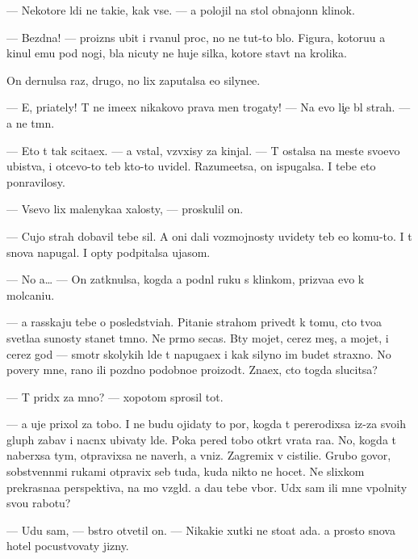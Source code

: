\documentclass[10pt]{book}
\begin{document}
— Nekotor{\yi}{\y}e l{\io}di ne taki{\y}e, kak vse. — {\Y}a polojil na stol obnajonn{\yi}{\y} klinok.

— Bezdna! — proizn{\e}s ubit{\yi}{\y} i rvanul proc, no ne tut-to b{\yi}lo. Figura, kotoru{\y}u {\y}a kinul {\y}emu pod nogi, b{\yi}la nicuty ne huje silka, ko\-to\-r{\yi}\-{\y}e stav{\ia}t na krolika.

On dernulsa raz, drugo{\y}, no lix zaputalsa {\y}e{\x}o silyne{\y}e.

— E{\y}, pri{\y}ately! T{\yi} ne ime{\y}ex nikakovo prava men{\ia} trogaty! — Na {\y}evo li{\c}e b{\yi}l strah. — {\Y}a ne t{\e}mn{\yi}{\y}.

— Eto t{\yi} tak scita{\y}ex. — {\Y}a vstal, vz{\ia}vxisy za kinjal. — T{\yi} ostalsa na meste svo{\y}evo ubi{\y}stva, i otcevo-to teb{\ia} kto-to uvidel. Razume{\y}etsa, on ispugalsa. I tebe eto ponravilosy.

— Vsevo lix malenyka{\y}a xalosty, — proskulil on.

— Cujo{\y} strah dobavil tebe sil. A oni dali vozmojnosty uvidety teb{\ia} {\y}e{\x}o komu-to. I t{\yi} snova napugal. I op{\ia}ty podpitalsa ujasom.

— No {\y}a… — On zatknulsa, kogda {\y}a podn{\ia}l ruku s klinkom, priz{\yi}va{\y}a {\y}evo k molcani{\y}u.

— {\Y}a rasskaju tebe o posledstvi{\y}ah. Pitani{\y}e strahom prived{\e}t k tomu, cto tvo{\y}a svetla{\y}a su{\x}nosty stanet t{\e}mno{\y}. Ne pr{\ia}mo se{\y}cas. B{\yi}ty mojet, cerez mes{\ia}{\c}, a mojet, i cerez god — smotr{\ia} skolykih l{\io}de{\y} t{\yi} napuga{\y}ex i kak silyno im budet straxno. No povery mne, rano ili pozdno po\-dob\-no\-{\y}e proizo{\y}d{\e}t. Zna{\y}ex, cto togda slucitsa?

— T{\yi} prid{\e}x za mno{\y}? — xopotom sprosil tot.

— {\Y}a uje prixol za tobo{\y}. I ne budu ojidaty to{\y} por{\yi}, kogda t{\yi} pererodixsa iz-za svo{\y}ih glup{\yi}h zabav i nacn{\e}x ubivaty l{\io}de{\y}. Poka pered tobo{\y} otkr{\yi}t{\yi} vra\-ta ra{\y}a. No, kogda t{\yi} naber{\e}xsa tym{\yi}, otpravixsa ne naverh, a vniz. Zagremix v cistili{\x}e. Grubo go\-vo\-r{\ia}, sobstvenn{\yi}mi rukami otpravix seb{\ia} tuda, kuda nikto ne hocet. Ne slixkom prekrasna{\y}a perspektiva, na mo{\y} vzgl{\ia}d. {\Y}a da{\y}u tebe v{\yi}bor. U{\y}d{\e}x sam ili mne v{\yi}\-pol\-nity svo{\y}u rabotu?

— U{\y}du sam, — b{\yi}stro otvetil on. — Nikaki{\y}e xutki ne sto{\y}at ada. {\Y}a prosto snova hotel pocustvovaty jizny.
\end{document}
